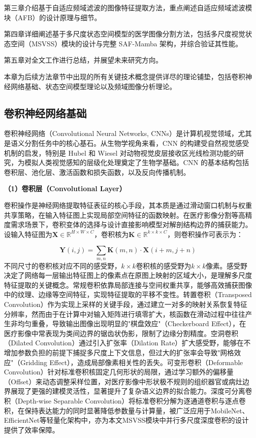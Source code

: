 \documentclass[12pt, a4paper, twoside]{article}
\begin{document}
第三章介绍基于自适应频域滤波的图像特征提取方法，重点阐述自适应频域滤波模块（AFB）的设计原理与细节。

第四章详细阐述基于多尺度状态空间模型的医学图像分割方法，包括多尺度视觉状态空间（MSVSS）模块的设计与完整 SAF-Mamba 架构，并综合验证其性能。

第五章对全文工作进行总结，并展望未来研究方向。


本章为后续方法章节中出现的所有关键技术概念提供详尽的理论铺垫，包括卷积神经网络基础、状态空间模型理论以及频域图像分析理论。

\subsection{卷积神经网络基础}


卷积神经网络（Convolutional Neural Networks, CNNs）是计算机视觉领域，尤其是语义分割任务中的核心基石。从生物学视角来看，CNN 的构建受自然视觉感受机制的启发，特别是 Hubel 和 Wiesel 对动物视觉皮层接收区光线检测功能的研究，为模拟人类视觉感知的层级化处理奠定了生物学基础。CNN 的基本结构包括卷积层、池化层、激活函数和损失函数，以及反向传播机制。

\textbf{（1）卷积层（Convolutional Layer）}

卷积操作是神经网络提取特征表征的核心手段，其本质是通过滑动窗口机制与权重共享策略，在输入特征图上实现局部空间特征的函数映射。在医疗影像分割等高精度需求场景下，卷积变体的选择与设计直接影响模型对解剖结构边界的捕获能力。设输入特征图为$\mathbf{X} \in \mathbb{R}^{H \times W \times C}$，卷积核为$\mathbf{K} \in \mathbb{R}^{k \times k \times C}$，则卷积操作可表示为：


\begin{equation}
\mathbf{Y}(i,j) = \sum_{m,n} \mathbf{K}(m,n) \cdot \mathbf{X}(i+m, j+n)
\end{equation}
不同尺寸的卷积核对应不同的感受野，$k \times k$卷积核的感受野为$k \times k$像素。感受野决定了网络每一层输出特征图上的像素点在原图上映射的区域大小，是理解多尺度特征提取的关键概念。常规卷积依靠局部连接与空间权重共享，能够高效捕获图像中的纹理、边缘等空间特征，实现特征提取的平移不变性。转置卷积（Transposed Convolution）作为实现上采样的关键手段，通过建立一对多的映射关系恢复特征分辨率，然而由于在计算中对输入矩阵进行填零扩大，核函数在滑动过程中往往产生非均匀重叠，导致输出图像出现明显的"棋盘效应"（Checkerboard Effect），在医疗影像中常表现为类间边界的锯齿状伪影，限制了边缘分割精度。空洞卷积（Dilated Convolution）通过引入扩张率（Dilation Rate）扩大感受野，能够在不增加参数负担的前提下捕捉多尺度上下文信息，但过大的扩张率会导致"网格效应"（Gridding Effect），造成局部像素相关性的丢失。可变形卷积（Deformable Convolution）针对标准卷积核固定几何形状的局限，通过学习额外的偏移量（Offset）来动态调整采样位置，对医疗影像中形状极不规则的组织器官或病灶边界展现了更强的建模灵活性，显著提升了复杂语义边界的拟合能力。深度可分离卷积（Depth-wise Separable Convolution）将标准卷积分解为逐通道卷积与逐点卷积，在保持表达能力的同时显著降低参数量与计算量，被广泛应用于MobileNet、EfficientNet等轻量化架构中，亦为本文MSVSS模块中并行多尺度深度卷积的设计提供了效率保障。
\end{document}
